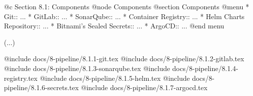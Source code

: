 @c Section 8.1: Components
@node Components
@section Components
@menu
* Git:: ...
* GitLab:: ...
* SonarQube:: ...
* Container Registry:: ...
* Helm Charts Repository:: ...
* Bitnami's Sealed Secrets:: ...
* ArgoCD:: ...
@end menu

(...)

@include docs/8-pipeline/8.1.1-git.tex
@include docs/8-pipeline/8.1.2-gitlab.tex
@include docs/8-pipeline/8.1.3-sonarqube.tex
@include docs/8-pipeline/8.1.4-registry.tex
@include docs/8-pipeline/8.1.5-helm.tex
@include docs/8-pipeline/8.1.6-secrets.tex
@include docs/8-pipeline/8.1.7-argocd.tex
